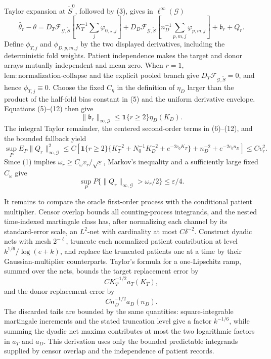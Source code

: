 Taylor expansion at \(\widetilde S^0\), followed by (3), gives in
\(\ell^\infty(\mathcal G)\)
\[
 \widehat\theta_r-\theta
 =D_T\mathcal F_{\mathcal G,\widetilde S}
   \left[K_T^{-1}\sum_j\varphi_{0,\star,j}\right]
 +D_D\mathcal F_{\mathcal G,\widetilde S}
   \left[n_D^{-1}\sum_{p,m,j}\varphi_{p,m,j}\right]
 +\mathfrak b_r+Q_r.                                        \tag{14}
\]
Define \(\phi_{T,j}\) and \(\phi_{D,p,m,j}\) by the two displayed
derivatives, including the deterministic fold weights.  Patient
independence makes the target and donor arrays mutually independent and
mean zero.  When \(r=1\),
\(\mathrm{lem:normalization\mbox{-}collapse}\) and the explicit pooled
branch give \(D_T\mathcal F_{\mathcal G,\widetilde S}=0\), and hence
\(\phi_{T,j}\equiv0\).  Choose the fixed \(C_\eta\) in the definition of
\(\eta_D\) larger than the product of the half-fold bias constant in (5)
and the uniform derivative envelope.  Equations (5)--(12) then give
\[
 \|\mathfrak b_r\|_{\infty,\mathcal G}
 \le\mathbf 1\{r\ge2\}\eta_D(K_D).                        \tag{15}
\]
The integral Taylor remainder, the centered second-order terms in
(6)--(12), and the bounded fallback yield
\[
 \sup_P E_P\|Q_r\|_{\infty,\mathcal G}^2
 \le C\left[
 \mathbf 1\{r\ge2\}\{K_T^{-2}+N_0^{-1}K_D^{-2}
                         +e^{-2c_0K_T}\}
 +n_D^{-2}+e^{-2c_0n_D}
 \right]
 \le C v_r^2.                                                \tag{16}
\]
Since (1) implies \(\omega_r\ge C_\omega v_r/\sqrt\varepsilon\),
Markov's inequality and a sufficiently large fixed \(C_\omega\) give
\[
 \sup_P P\{\|Q_r\|_{\infty,\mathcal G}>\omega_r/2\}
 \le\varepsilon/4.                                          \tag{17}
\]

It remains to compare the oracle first-order process with the conditional
patient multiplier.  Censor overlap bounds all counting-process
integrands, and the nested time-indexed martingale class has, after
normalizing each channel by its standard-error scale, an \(L^2\)-net with
cardinality at most \(C\delta^{-2}\).  Construct dyadic nets with mesh
\(2^{-\ell}\), truncate each normalized patient contribution at level
\(k^{1/6}/\log(e+k)\), and replace the truncated patients one at a time by
their Gaussian-multiplier counterparts.  Taylor's formula for a
one-Lipschitz ramp, summed over the nets, bounds the target replacement
error by
\[
 C K_T^{-1/2}a_T(K_T),
\]
and the donor replacement error by
\[
 C n_D^{-1/2}a_D(n_D).
\]
The discarded tails are bounded by the same quantities: square-integrable
martingale increments and the stated truncation level give a factor
\(k^{-1/6}\), while summing the dyadic net maxima contributes at most the
two logarithmic factors in \(a_T\) and \(a_D\).  This derivation uses only
the bounded predictable integrands supplied by censor overlap and the
independence of patient records.

